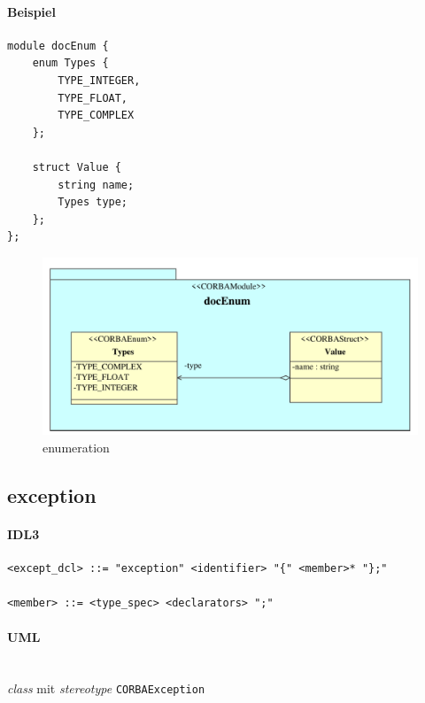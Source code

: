 \documentclass [a4paper,10pt] {scrartcl}
\begin{document}
\paragraph{Beispiel}
\begin{verbatim}
module docEnum {
    enum Types {
        TYPE_INTEGER,
        TYPE_FLOAT,
        TYPE_COMPLEX
    };

    struct Value {
        string name;
        Types type;
    };
};
\end{verbatim}
\begin{figure}[!h]
\centerline{\includegraphics[width=\linewidth]{docEnum}}
\caption{enumeration}
\label{fig:enum}
\end{figure}

\cleardoublepage
\subsection{exception}
\paragraph{IDL3}
\begin{verbatim}
<except_dcl> ::= "exception" <identifier> "{" <member>* "};"

<member> ::= <type_spec> <declarators> ";"
\end{verbatim}
\paragraph{UML}~\\
\emph{class} mit \emph{stereotype} \texttt{CORBAException}\\
\end{document}
